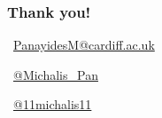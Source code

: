 \begin{frame}
    \frametitle{Thank you!}
    \centering

    \vspace{0.8cm}
    \faEnvelope \, \url{PanayidesM@cardiff.ac.uk}

    \vspace{0.8cm}
    \faTwitterSquare \, \url{@Michalis_Pan}

    \vspace{0.8cm}
    \faGithubSquare \, \url{@11michalis11}

\end{frame}

